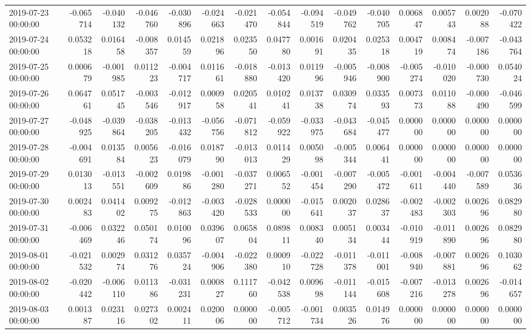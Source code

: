 \begin{tabular}{lrrrrrrrrrrrrrr}
2019-07-23 00:00:00 & -0.065714 & -0.040132 & -0.046760 & -0.030896 & -0.024663 & -0.021470 & -0.054844 & -0.094519 & -0.049762 & -0.040705 & 0.006847 & 0.005743 & 0.002088 & -0.070422 \\
2019-07-24 00:00:00 & 0.053218 & 0.016458 & -0.008357 & 0.014559 & 0.021896 & 0.023550 & 0.047780 & 0.001691 & 0.020435 & 0.025318 & 0.004719 & 0.008474 & -0.007186 & -0.043764 \\
2019-07-25 00:00:00 & 0.000679 & -0.001985 & 0.011223 & -0.004717 & 0.011661 & -0.018880 & -0.013420 & 0.011996 & -0.005946 & -0.008900 & -0.005274 & -0.010020 & -0.000730 & 0.054024 \\
2019-07-26 00:00:00 & 0.064761 & 0.051745 & -0.003546 & -0.012917 & 0.000958 & 0.020541 & 0.010241 & 0.013738 & 0.030974 & 0.033593 & 0.007373 & 0.011088 & -0.000490 & -0.046599 \\
2019-07-27 00:00:00 & -0.048925 & -0.039864 & -0.038205 & -0.013432 & -0.056756 & -0.071812 & -0.059922 & -0.033975 & -0.043684 & -0.045477 & 0.000000 & 0.000000 & 0.000000 & 0.000000 \\
2019-07-28 00:00:00 & -0.004691 & 0.013584 & 0.005623 & -0.016079 & 0.018790 & -0.013013 & 0.011429 & 0.005098 & -0.005344 & 0.006441 & 0.000000 & 0.000000 & 0.000000 & 0.000000 \\
2019-07-29 00:00:00 & 0.013013 & -0.013551 & -0.002609 & 0.019886 & -0.001280 & -0.037271 & 0.006552 & -0.001454 & -0.007290 & -0.005472 & -0.001611 & -0.004440 & -0.007589 & 0.053636 \\
2019-07-30 00:00:00 & 0.002483 & 0.041402 & 0.009275 & -0.012863 & -0.003420 & -0.028533 & 0.000000 & -0.015641 & 0.002037 & 0.028637 & -0.002483 & -0.002303 & 0.002696 & 0.082980 \\
2019-07-31 00:00:00 & -0.006469 & 0.032246 & 0.050174 & 0.010096 & 0.039607 & 0.065804 & 0.089811 & 0.008340 & 0.005134 & 0.003444 & -0.010919 & -0.011890 & 0.002696 & 0.082980 \\
2019-08-01 00:00:00 & -0.021532 & 0.002974 & 0.031276 & 0.035724 & -0.004906 & -0.022380 & 0.000910 & -0.022728 & -0.011378 & -0.011001 & -0.008940 & -0.007881 & 0.002696 & 0.103062 \\
2019-08-02 00:00:00 & -0.020442 & -0.006110 & 0.011386 & -0.031231 & 0.000827 & 0.111760 & -0.042538 & 0.009698 & -0.011144 & -0.015608 & -0.007216 & -0.013278 & 0.002696 & -0.014657 \\
2019-08-03 00:00:00 & 0.001387 & 0.023116 & 0.027302 & 0.002411 & 0.020006 & 0.000000 & -0.005712 & -0.001734 & 0.003526 & 0.014976 & 0.000000 & 0.000000 & 0.000000 & 0.000000 \\

\end{tabular}

